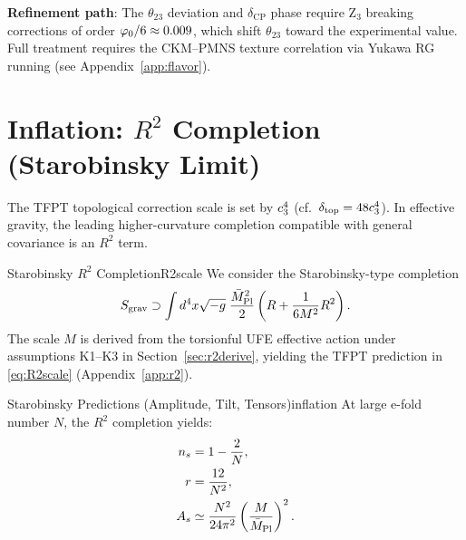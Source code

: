 \begin{tcolorbox}[colback=blue!3, colframe=blue!50!black, 
    title={\textbf{PMNS: closed sub-block vs.\ open interface}}, fonttitle=\bfseries]
\textbf{Refinement path}: The $\theta_{23}$ deviation and $\delta_{\mathrm{CP}}$ phase require 
Z$_3$ breaking corrections of order $\varphi_0/6 \approx 0.009$, which shift $\theta_{23}$ toward 
the experimental value. Full treatment requires the CKM--PMNS texture correlation via 
Yukawa RG running (see Appendix~\ref{app:flavor}).
\end{tcolorbox}

\TFPTZthreePermutationMatrix

\TFPTPMNSVariantTable

\section{\texorpdfstring{Inflation: $R^2$ Completion (Starobinsky Limit)}{Inflation: R2 Completion (Starobinsky Limit)}}

The TFPT topological correction scale is set by $c_3^4$ (cf.\ $\delta_{\mathrm{top}} = 48c_3^4$). 
In effective gravity, the leading higher-curvature completion compatible with general covariance is an $R^2$ term.

\begin{definition}{Starobinsky $R^2$ Completion}{R2scale}
We consider the Starobinsky-type completion
\begin{equation}
    S_{\text{grav}} \supset \int d^4x\sqrt{-g}\;\frac{\bar{M}_{\mathrm{Pl}}^2}{2}\left(R + \frac{1}{6M^2}R^2\right).
    \label{eq:R2action}
\end{equation}
The scale $M$ is derived from the torsionful UFE effective action under
assumptions K1--K3 in Section~\ref{sec:r2derive}, yielding the TFPT prediction in
\eqref{eq:R2scale} (Appendix~\ref{app:r2}).
\end{definition}

\begin{theorem}{Starobinsky Predictions (Amplitude, Tilt, Tensors)}{inflation}
At large e-fold number $N$, the $R^2$ completion yields:
\begin{align}
    n_s &= 1 - \frac{2}{N}, \label{eq:ns}\\
    r &= \frac{12}{N^2}, \label{eq:r}\\
    A_s &\simeq \frac{N^2}{24\pi^2}\left(\frac{M}{\bar{M}_{\mathrm{Pl}}}\right)^2. \label{eq:As}
\end{align}
\end{theorem}

